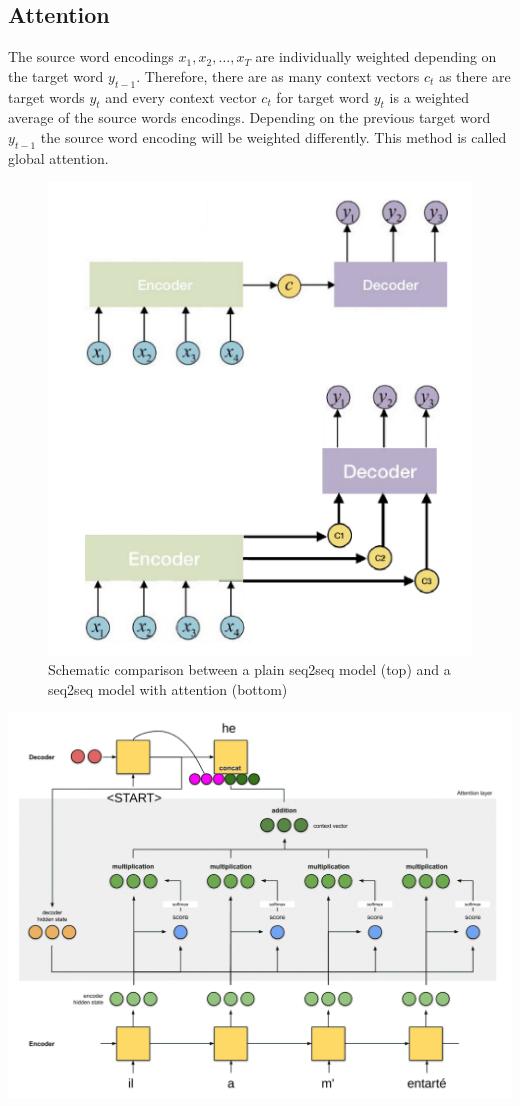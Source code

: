 \documentclass[11pt]{article}
\begin{document}
\subsection{Attention}
\begin{minipage}{0.65\linewidth}
	The source word encodings $x_1,x_2, \dots, x_T$ are individually weighted depending on the target word $y_{t-1}$. Therefore, there are as many context vectors $c_t$ as there are target words $y_t$ and every context vector $c_t$ for target word $y_t$ is a weighted average of the source words encodings. Depending on the previous target word $y_{t-1}$ the source word encoding will be weighted differently. This method is called global attention.
\end{minipage}
\begin{minipage}{0.3\linewidth}
\begin{figure}[H]
	\includegraphics[width=\linewidth]{img/seq2seq_attention2}
	\caption{Schematic comparison between a plain seq2seq model (top) and a seq2seq model with attention (bottom)}
	\label{fig:seq2seqattention}
\end{figure}
\end{minipage}

\begin{center}
	\includegraphics[width=0.6\linewidth]{img/seq2seq_attention}
\end{center}
\end{document}
